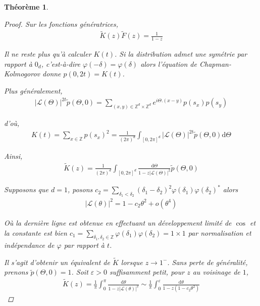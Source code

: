 \documentclass{article}
\newtheorem{theorem}{Théorème}[section]
\theoremstyle{definition}
\begin{document}
\begin{theorem}
\begin{proof}
Sur les fonctions génératrices,
\begin{align*}
	\tilde{K}(z)\tilde{F}(z) = \frac{1}{1-z} \tag{2}
\end{align*}

Il ne reste plus qu'à calculer $K(t)$. Si la distribution admet une symétrie par rapport à $0_d$, c'est-à-dire $\varphi(-\delta) = \varphi(\delta)$ alors l'équation de Chapman-Kolmogorov donne $p(0,2t) = K(t)$. 


Plus généralement,
	\begin{align*}
		|\mathcal{L}(\Theta)|^{2t}\tilde{p}(\Theta,0) = \sum_{(x,y)\in\mathbb{Z}^d\times\mathbb{Z}^d} e^{i\Theta.(x-y)}p(s_x)p(s_y)
	\end{align*}

	d'où, 
\begin{align*}
	K(t) = \sum_{x\in \mathbb{Z}}p(s_x)^2 = \frac{1}{(2\pi)^d}\int_{[0,2\pi]^d}|\mathcal{L}(\Theta)|^{2t} \tilde{p}(\Theta, 0)\mathrm{d}\Theta
	\end{align*}

Ainsi, 
\begin{align*}
	\tilde{K}(z)
		     =\frac{1}{(2\pi)^d}\int_{[0,2\pi]^d}\frac{\mathrm{d}\Theta}{1-z|\mathcal{L}(\Theta)|^{2}}\tilde{p}(\Theta, 0)
\end{align*}

Supposons que $d=1$, posons $c_2 = \sum_{\delta_1<\delta_2} (\delta_1-\delta_2)^2 \varphi(\delta_1)\varphi(\delta_2)^*$ alors
\begin{align*}
|\mathcal{L}(\theta)|^2 %
			= 1-c_2\theta^2+o(\theta^4)
\end{align*}

Où la dernière ligne est obtenue en effectuant un développement limité de $\cos$ et la constante est bien $c_1 = \sum_{\delta_1,\delta_2\in\mathbb{Z}}\varphi(\delta_1)\varphi(\delta_2) = 1\times 1$ par normalisation et indépendance de $\varphi$ par rapport à $t$.

Il s'agit d'obtenir un équivalent de $\tilde{K}$ lorsque $z\to 1^-$. Sans perte de généralité, prenons $\tilde{p}(\Theta,0) = 1$. Soit $\varepsilon > 0$ suffisamment petit, pour $z$ au voisinage de $1$, 
\begin{align*}
	\tilde{K}(z) = \frac{1}{\pi}\int_{0}^{\pi}\frac{\mathrm{d}\theta}{1-z|\mathcal{L}(\theta)|^2} 
	\sim\frac{1}{\pi}\int_{0}^{\varepsilon}\frac{\mathrm{d}\theta}{1-z(1-c_2\theta^2)} 
\end{align*}


\end{proof}
\end{theorem}
\end{document}
